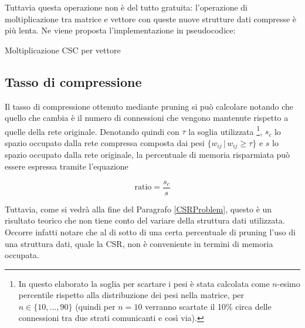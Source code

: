 \documentclass[12pt]{report}
\begin{document}
Tuttavia questa operazione non è del tutto gratuita: l'operazione di moltiplicazione tra matrice e vettore con queste nuove strutture dati compresse è più lenta.
Ne viene proposta l'implementazione in pseudocodice:

\null\par\null

\makeatletter
\def\BState{\State\hskip-\ALG@thistlm}
\makeatother
\begin{algorithm}
\caption{Moltiplicazione CSC per vettore}
\end{algorithm}

\newpage

\subsection{Tasso di compressione}

Il tasso di compressione ottenuto mediante pruning si può calcolare notando che quello che cambia è il numero di connessioni che vengono mantenute rispetto a quelle della rete originale. Denotando quindi con $\tau$ la soglia utilizzata \footnote{In questo elaborato la soglia per scartare i pesi è stata calcolata come $n$-esimo percentile rispetto alla distribuzione dei pesi nella matrice, per $n \in \{10, \dots, 90 \}$ (quindi per $n=10$ verranno scartate il 10\% circa delle connessioni tra due strati comunicanti e così via).}, $s_c$ lo spazio occupato dalla rete compressa composta dai pesi $\lbrace w_{ij} \,|\, w_{ij} \geq \tau \rbrace$ e $s$ lo spazio occupato dalla rete originale, la percentuale di memoria risparmiata può essere espressa tramite l'equazione

\begin{equation}
\mathrm{ratio} = \frac{s_c}{s}
\end{equation}

Tuttavia, come si vedrà alla fine del Paragrafo \ref{CSRProblem}, questo è un risultato teorico che non tiene conto del variare della struttura dati utilizzata. Occorre infatti notare che al di sotto di una certa percentuale di pruning l'uso di una struttura dati, quale la CSR, non è conveniente in termini di memoria occupata.
\end{document}
